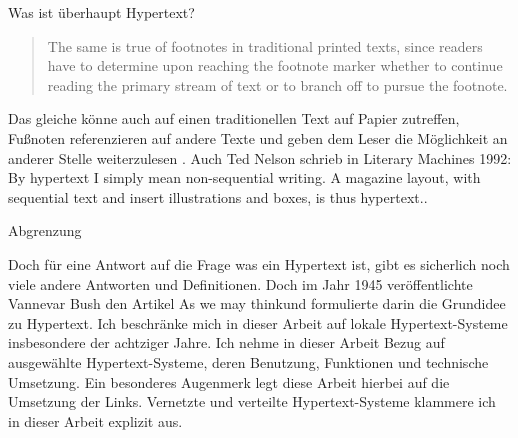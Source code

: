 \begin{section}{Was ist überhaupt Hypertext?}
\begin{quote}
    \glqq The same is true of footnotes in traditional printed texts, since readers have to determine upon reaching the footnote marker whether to continue reading the primary stream of text or to branch off to pursue the footnote. \grqq{ }\cite{Nielsen1995}
\end{quote}

Das gleiche könne auch auf einen traditionellen Text auf Papier zutreffen, Fußnoten referenzieren auf andere Texte und geben dem Leser die Möglichkeit an anderer Stelle weiterzulesen \cite{Nielsen1995}. Auch Ted Nelson schrieb in Literary Machines 1992: \glqq By hypertext I simply mean non-sequential writing. A magazine layout, with sequential text and insert illustrations and boxes, is thus hypertext.\grqq{ }\cite{Nelson1992}.

\end{section}

\begin{section}{Abgrenzung}
\label{sec:abgrenzung}

Doch für eine Antwort auf die Frage was ein Hypertext ist, gibt es sicherlich noch viele andere Antworten und Definitionen. Doch im Jahr 1945 veröffentlichte Vannevar Bush den Artikel \glqq As we may think\grqq{ }und formulierte darin die Grundidee zu Hypertext. Ich beschränke mich in dieser Arbeit auf lokale Hypertext-Systeme insbesondere der achtziger Jahre. Ich nehme in dieser Arbeit Bezug auf ausgewählte Hypertext-Systeme, deren Benutzung, Funktionen und technische Umsetzung. Ein besonderes Augenmerk legt diese Arbeit hierbei auf die Umsetzung der Links. Vernetzte und verteilte Hypertext-Systeme klammere ich in dieser Arbeit explizit aus.

\end{section}